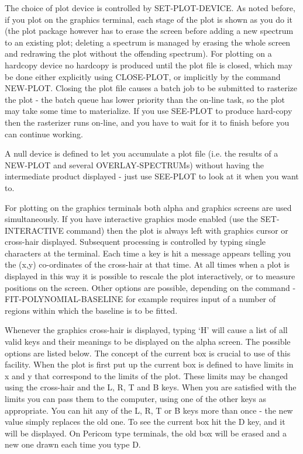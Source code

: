 \documentclass[11pt,twoside]{report}
\begin{document}
The choice of plot device is controlled by SET-PLOT-DEVICE.
As noted before, if you plot on the graphics terminal, each stage of the plot
is shown as you do it (the plot package however has to erase the screen before
adding a new spectrum to an existing plot; deleting a spectrum is managed by
erasing the whole screen and redrawing the plot without the offending
spectrum). For plotting on a hardcopy device no hardcopy is produced until the
plot file is closed, which may be done either explicitly using CLOSE-PLOT, or
implicitly by the command NEW-PLOT. Closing the plot file causes a batch
job to be submitted to rasterize the plot - the batch
queue has lower priority than the on-line task, so the plot may take some time
to materialize. If you use SEE-PLOT to produce hard-copy then the
rasterizer runs on-line, and you have to wait for it to
finish before you can continue working.

A null device is defined to let you accumulate a
plot file (i.e. the results of a NEW-PLOT and several OVERLAY-SPECTRUMs) without
having the intermediate product displayed - just use SEE-PLOT to look at it
when you want to.

For plotting on the graphics terminals both alpha and graphics screens are used
simultaneously.  If you have interactive graphics mode enabled (use
the SET-INTERACTIVE command) then the plot is always left with graphics cursor
or cross-hair displayed. 
Subsequent processing is controlled by typing single characters at the
terminal. Each time a key is hit a message appears telling you the (x,y)
co-ordinates of the cross-hair at that time. At all times when a plot is
displayed in this way it is possible to rescale the plot interactively, or to
measure positions on the screen. Other options are possible, depending on the
command - FIT-POLYNOMIAL-BASELINE for example requires input of a number of
regions within which the baseline is to be fitted.

Whenever the graphics cross-hair is displayed, typing `H' will cause a list of
all valid keys  and their meanings to be
displayed on the alpha screen. The possible options are listed below. The
concept of the current box   is crucial
to use of this facility. When the plot is first put up the current box is
defined to have limits in x and y that correspond to the limits of the plot.
These limits may be changed using the cross-hair and the L, R, T and B keys.
When you are satisfied with the limits you can pass them to the computer, using
one of the other keys as appropriate. You can hit any of the L, R, T or B keys
more than once - the new value simply replaces the old one. To see the current
box hit the D key, and it will be displayed. On Pericom type terminals, the old
box will be erased and a new one drawn each time you type D.
\end{document}
